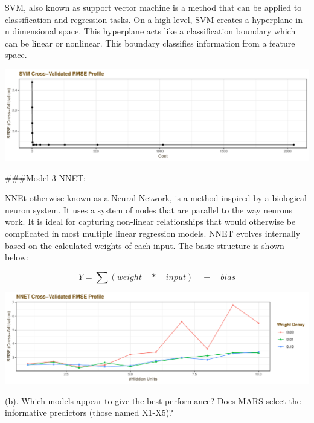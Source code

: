 \documentclass[]{report}
\begin{document}
SVM, also known as support vector machine is a method that can be
applied to classification and regression tasks. On a high level, SVM
creates a hyperplane in n dimensional space. This hyperplane acts like a
classification boundary which can be linear or nonlinear. This boundary
classifies information from a feature space.

\includegraphics{Homework-Two_files/figure-latex/kj-7.2-2-1.pdf}

\#\#\#Model 3 NNET:

NNEt otherwise known as a Neural Network, is a method inspired by a
biological neuron system. It uses a system of nodes that are parallel to
the way neurons work. It is ideal for capturing non-linear relationships
that would otherwise be complicated in most multiple linear regression
models. NNET evolves internally based on the calculated weights of each
input. The basic structure is shown below:

\[
Y=\sum { (weight\quad *\quad input)\quad +\quad bias } 
\]

\includegraphics{Homework-Two_files/figure-latex/kj-7.2-3-1.pdf}

\begin{subquestion}{(b).}
Which models appear to give the best performance? Does MARS select the informative predictors (those named X1-X5)?
\end{subquestion}
\end{document}
